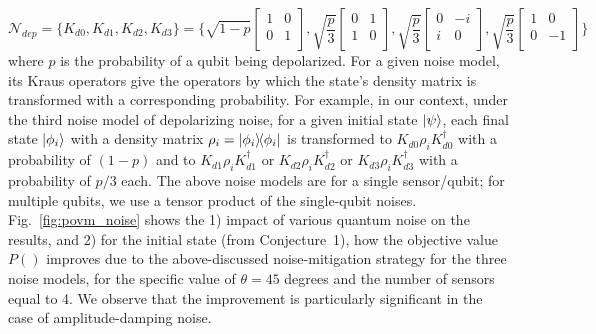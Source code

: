 $$ \mathcal{N}_{dep} = \{K_{d0}, K_{d1}, K_{d2}, K_{d3}\} =  \{\sqrt{1-p}\begin{bmatrix}
  1 & 0 \\
  0 & 1 \\
\end{bmatrix}, \sqrt{\frac{p}{3}}\begin{bmatrix}
  0 & 1 \\
  1 & 0 \\
\end{bmatrix}, \sqrt{\frac{p}{3}}\begin{bmatrix}
  0 & -i \\
  i & 0 \\
\end{bmatrix}, \sqrt{\frac{p}{3}}\begin{bmatrix}
  1 & 0 \\
  0 & -1 \\
\end{bmatrix} \}$$
where $p$ is the probability of a qubit being depolarized.
For a given noise model, its Kraus operators give the operators by which the state's density matrix is transformed with a corresponding probability. 
For example, in our context, under the third noise model of depolarizing noise, for a given initial state $\ket{\psi}$, 
each final state $\ket{\phi_i}$ with a density matrix $\rho_i = \ketbra{\phi_i}$ is transformed to $K_{d0}\rho_i K^{\dagger}_{d0}$ with a probability of $(1-p)$ and to $K_{d1}\rho_i K^{\dagger}_{d1}$ or $K_{d2}\rho_i K^{\dagger}_{d2}$ or 
$K_{d3}\rho_i K^{\dagger}_{d3}$ with a 
probability of $p/3$ each.
The above noise models are for a single sensor/qubit; 
for multiple qubits, we use a tensor product of the single-qubit noises.
Fig.~\ref{fig:povm_noise} shows the 1) impact of various quantum noise on the results, and 2) for the initial state (from Conjecture~1),
how the objective value $P()$ improves due to the above-discussed noise-mitigation strategy for the three noise models, for the specific value of $\theta = 45$ degrees and the number of sensors equal to 4.
We observe that the improvement is particularly significant in the case of amplitude-damping noise.


